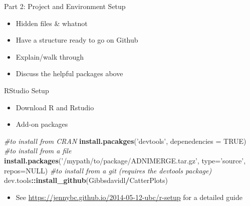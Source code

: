 \documentclass[
  ignorenonframetext,
]{beamer}
\newenvironment{Shaded}{\begin{snugshade}}{\end{snugshade}}
\newcommand{\CommentTok}[1]{\textcolor[rgb]{0.56,0.35,0.01}{\textit{#1}}}
\newcommand{\DataTypeTok}[1]{\textcolor[rgb]{0.13,0.29,0.53}{#1}}
\newcommand{\KeywordTok}[1]{\textcolor[rgb]{0.13,0.29,0.53}{\textbf{#1}}}
\newcommand{\NormalTok}[1]{#1}
\newcommand{\OperatorTok}[1]{\textcolor[rgb]{0.81,0.36,0.00}{\textbf{#1}}}
\newcommand{\OtherTok}[1]{\textcolor[rgb]{0.56,0.35,0.01}{#1}}
\newcommand{\StringTok}[1]{\textcolor[rgb]{0.31,0.60,0.02}{#1}}
\providecommand{\tightlist}{%
  \setlength{\itemsep}{0pt}\setlength{\parskip}{0pt}}
\begin{document}
\begin{frame}{Part 2: Project and Environment Setup}
\protect\hypertarget{part-2-project-and-environment-setup}{}

\begin{itemize}[<+->]
\tightlist
\item
  Hidden files \& whatnot
\item
  Have a structure ready to go on Github
\item
  Explain/walk through
\item
  Discuss the helpful packages above
\end{itemize}

\end{frame}

\begin{frame}[fragile]{RStudio Setup}
\protect\hypertarget{rstudio-setup}{}

\begin{itemize}[<+->]
\tightlist
\item
  Download R and Rstudio
\item
  Add-on packages
\end{itemize}

\begin{Shaded}
\begin{Highlighting}[]
\CommentTok{#to install from CRAN}
\KeywordTok{install.pacakges}\NormalTok{(}\StringTok{'devtools'}\NormalTok{, }\DataTypeTok{depenedencies =} \OtherTok{TRUE}\NormalTok{)}
\CommentTok{#to install from a file}
\KeywordTok{install.packages}\NormalTok{(}\StringTok{'/mypath/to/package/ADNIMERGE.tar.gz'}\NormalTok{, }
                 \DataTypeTok{type=}\StringTok{'source'}\NormalTok{, }\DataTypeTok{repos=}\OtherTok{NULL}\NormalTok{) }
\CommentTok{#to install from a git  (requires the devtools package)}
\NormalTok{dev.tools}\OperatorTok{::}\KeywordTok{install_github}\NormalTok{(Gibbsdavidl}\OperatorTok{/}\NormalTok{CatterPlots) }
\end{Highlighting}
\end{Shaded}

\begin{itemize}[<+->]
\tightlist
\item
  See
  \href{https://jennybc.github.io/2014-05-12-ubc/r-setup.html}{https://jennybc.github.io/2014-05-12-ubc/r-setup}
  for a detailed guide
\end{itemize}

\end{frame}
\end{document}
